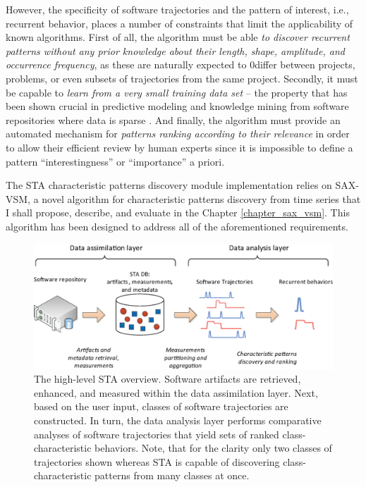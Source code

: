 However, the specificity of software trajectories and the pattern of interest, i.e., recurrent behavior, 
places a number of constraints that limit the applicability of known algorithms.
First of all, the algorithm must be able \textit{to discover recurrent patterns without any prior knowledge 
about their length, shape, amplitude, and occurrence frequency}, as these are naturally expected to 0differ 
between projects, problems, or even subsets of trajectories from the same project.
Secondly, it must be capable to \textit{learn from a very small training data set} --
the property that has been shown crucial in predictive modeling and knowledge mining from software 
repositories where data is sparse \cite{citeulike:6055293}.
And finally, the algorithm must provide an automated mechanism for 
\textit{patterns ranking according to their relevance} in order to allow their efficient 
review by human experts since it is impossible to define a pattern ``interestingness'' or 
``importance'' a priori.

The STA characteristic patterns discovery module implementation relies on SAX-VSM,
a novel algorithm for characteristic patterns discovery from time series that I shall propose, describe, and evaluate 
in the Chapter \ref{chapter_sax_vsm}. 
This algorithm has been designed to address all of the aforementioned requirements.

\begin{figure}[t]
   \centering
   \includegraphics[width=150mm]{figures/Flow-analysis.eps}
   \caption{The high-level STA overview. Software artifacts are retrieved, enhanced, and measured within the
   data assimilation layer. Next, based on the user input, classes of software trajectories are constructed.   
   In turn, the data analysis layer performs comparative analyses of software trajectories that yield sets
   of ranked class-characteristic behaviors.
   Note, that for the clarity only two classes of trajectories shown whereas STA is capable of discovering
   class-characteristic patterns from many classes at once.}
   \label{fig:sta-full-overview}
\end{figure}

